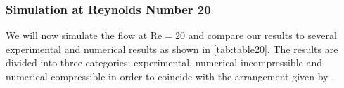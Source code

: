 %
	
	\subsubsection{Simulation at Reynolds Number 20}
	We will now simulate the flow at $\text{Re}=20$ and compare our results to several experimental and numerical results as shown in \cref{tab:table20}. The results are divided into three categories: experimental, numerical incompressible and numerical compressible in order to coincide with the arrangement given by \cite{ayers}.

